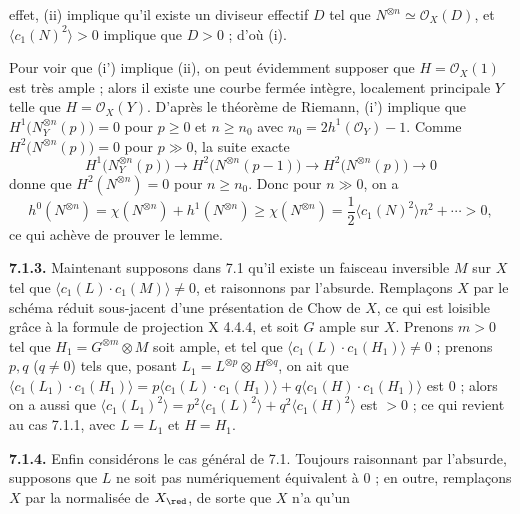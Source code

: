 effet, (ii) implique qu'il existe un diviseur effectif $D$ tel que $N^{\otimes n}\simeq\mathcal O_X(D)$, et $\langle c_1(N)^2\rangle>0$ implique que $D>0$ ; d'o\`u (i).

Pour voir que (i') implique (ii), on peut \'evidemment supposer que $H=\mathcal O_X(1)$ est tr\`es ample ; alors il existe une courbe ferm\'ee int\`egre, localement principale $Y$ telle que $H=\mathcal O_X(Y)$. D'apr\`es le th\'eor\`eme de Riemann, (i') implique que $H^1\bigl(N_Y^{\otimes n}(p)\bigr)=0$ pour $p\geq0$ et $n\geq n_0$ avec $n_0=2h^1(\mathcal O_Y)-1$. Comme $H^2\bigl(N^{\otimes n}(p)\bigr)=0$ pour $p\gg0$, la suite exacte
\[
   H^1\bigl(N_Y^{\otimes n}(p)\bigr)
   \longrightarrow H^2\bigl(N^{\otimes n}(p-1)\bigr)
   \longrightarrow H^2\bigl(N^{\otimes n}(p)\bigr)
   \longrightarrow0
\]
donne que $H^2(N^{\otimes n})=0$ pour $n\geq n_0$. Donc pour $n\gg0$, on a
\[
   h^0(N^{\otimes n})
   =\chi(N^{\otimes n})+h^1(N^{\otimes n})
   \geq\chi(N^{\otimes n})
   =\frac{1}{2}\langle c_1(N)^2\rangle n^2+\cdots>0,
\]
ce qui ach\`eve de prouver le lemme.

\textbf{7.1.3.} Maintenant supposons dans 7.1 qu'il existe un faisceau inversible $M$ sur $X$ tel que $\langle c_1(L)\cdot c_1(M)\rangle\ne0$, et raisonnons par l'absurde. Rempla\c{c}ons $X$ par le sch\'ema r\'eduit sous-jacent d'une pr\'esentation de Chow de $X$, ce qui est loisible gr\^ace \`a la formule de projection X 4.4.4, et soit $G$ ample sur $X$. Prenons $m>0$ tel que $H_1=G^{\otimes m}\otimes M$ soit ample, et tel que $\langle c_1(L)\cdot c_1(H_1)\rangle\ne0$ ; prenons $p,q$ ($q\ne0$) tels que, posant $L_1=L^{\otimes p}\otimes H^{\otimes q}$, on ait que $\langle c_1(L_1)\cdot c_1(H_1)\rangle=p\langle c_1(L)\cdot c_1(H_1)\rangle+q\langle c_1(H)\cdot c_1(H_1)\rangle$ est $0$ ; alors on a aussi que $\langle c_1(L_1)^2\rangle=p^2\langle c_1(L)^2\rangle+q^2\langle c_1(H)^2\rangle$ est $>0$ ; ce qui revient au cas 7.1.1, avec $L=L_1$ et $H=H_1$.

\textbf{7.1.4.} Enfin consid\'erons le cas g\'en\'eral de 7.1. Toujours raisonnant par l'absurde, supposons que $L$ ne soit pas num\'eriquement \'equivalent \`a $0$ ; en outre, rempla\c{c}ons $X$ par la normalis\'ee de $X_{\red}$, de sorte que $X$ n'a qu'un
